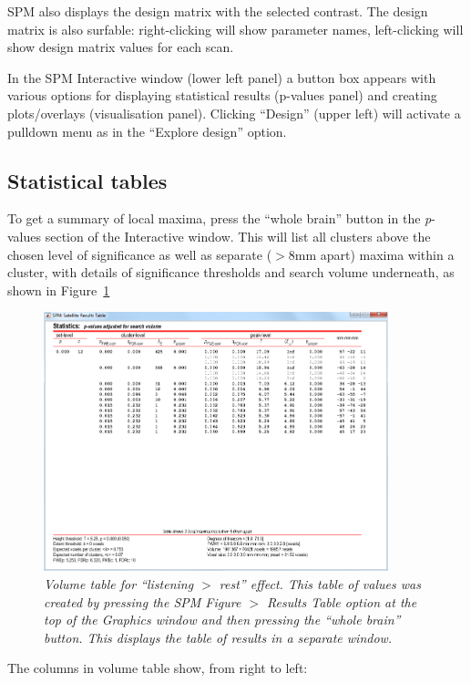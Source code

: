 SPM also displays the design matrix with the selected contrast. The design matrix is also surfable: right-clicking will show parameter names, left-clicking will show design matrix values for each scan. 

In the SPM Interactive window (lower left panel) a button box appears with various options for displaying statistical results (p-values panel) and creating plots/overlays (visualisation panel). Clicking ``Design'' (upper left) will activate a pulldown menu as in the ``Explore design'' option.

\subsection{Statistical tables}

To get a summary of local maxima, press the ``whole brain'' button in the \textit{p}-values section of the Interactive window. This will list all clusters above the chosen level of significance as well as separate ($>$8mm apart) maxima within a cluster, with details of significance thresholds and search volume underneath, as shown in Figure~\ref{aud_volume}

\begin{figure}
\begin{center}
\includegraphics[width=100mm]{auditory/volume}
\caption{\em Volume table for ``listening $>$ rest'' effect. This table of values was created by pressing the SPM Figure $>$ Results Table option at the top of the Graphics window and then pressing the ``whole brain'' button. This displays the table of results in a separate window. \label{aud_volume}}
\end{center}
\end{figure}

The columns in volume table show, from right to left:

